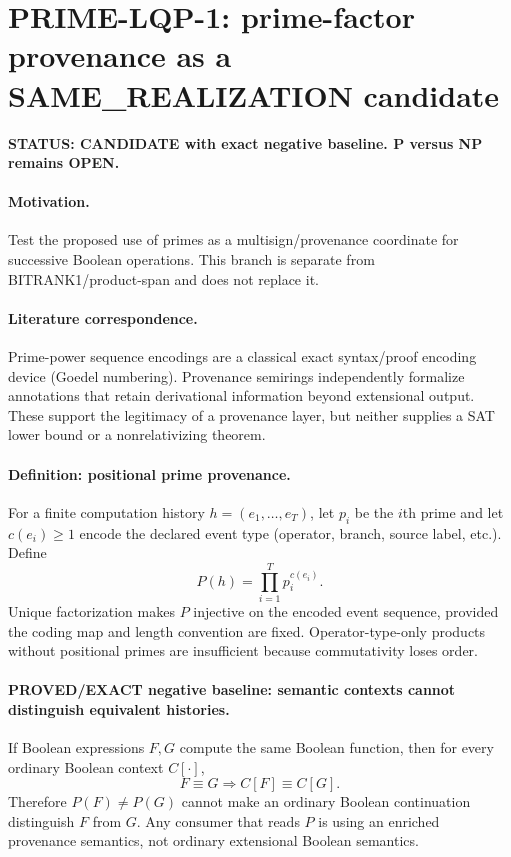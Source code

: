 \documentclass[11pt]{article}
\begin{document}
\section*{PRIME-LQP-1: prime-factor provenance as a SAME\_REALIZATION candidate}
\textbf{STATUS: CANDIDATE with exact negative baseline. P versus NP remains OPEN.}

\paragraph{Motivation.}
Test the proposed use of primes as a multisign/provenance coordinate for successive Boolean operations. This branch is separate from BITRANK1/product-span and does not replace it.

\paragraph{Literature correspondence.}
Prime-power sequence encodings are a classical exact syntax/proof encoding device (Goedel numbering). Provenance semirings independently formalize annotations that retain derivational information beyond extensional output. These support the legitimacy of a provenance layer, but neither supplies a SAT lower bound or a nonrelativizing theorem.

\paragraph{Definition: positional prime provenance.}
For a finite computation history $h=(e_1,\ldots,e_T)$, let $p_i$ be the $i$th prime and let $c(e_i)\ge1$ encode the declared event type (operator, branch, source label, etc.). Define
\[
P(h)=\prod_{i=1}^T p_i^{c(e_i)}.
\]
Unique factorization makes $P$ injective on the encoded event sequence, provided the coding map and length convention are fixed. Operator-type-only products without positional primes are insufficient because commutativity loses order.

\paragraph{PROVED/EXACT negative baseline: semantic contexts cannot distinguish equivalent histories.}
If Boolean expressions $F,G$ compute the same Boolean function, then for every ordinary Boolean context $C[\cdot]$,
\[
F\equiv G\Longrightarrow C[F]\equiv C[G].
\]
Therefore $P(F)\ne P(G)$ cannot make an ordinary Boolean continuation distinguish $F$ from $G$. Any consumer that reads $P$ is using an enriched provenance semantics, not ordinary extensional Boolean semantics.
\end{document}
